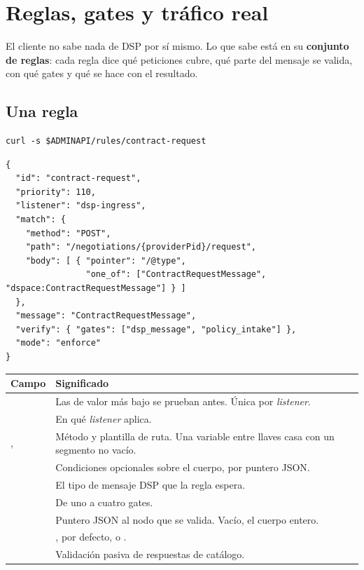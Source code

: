 \chapter{Reglas, gates y tráfico real}
\label{ch:reglas}

El cliente no sabe nada de DSP por sí mismo. Lo que sabe está en su \textbf{conjunto de reglas}: cada regla
dice qué peticiones cubre, qué parte del mensaje se valida, con qué gates y qué se hace con el resultado.

\section{Una regla}

\begin{lstlisting}[style=sh]
curl -s $ADMINAPI/rules/contract-request
\end{lstlisting}
\begin{lstlisting}[style=json]
{
  "id": "contract-request",
  "priority": 110,
  "listener": "dsp-ingress",
  "match": {
    "method": "POST",
    "path": "/negotiations/{providerPid}/request",
    "body": [ { "pointer": "/@type",
                "one_of": ["ContractRequestMessage", "dspace:ContractRequestMessage"] } ]
  },
  "message": "ContractRequestMessage",
  "verify": { "gates": ["dsp_message", "policy_intake"] },
  "mode": "enforce"
}
\end{lstlisting}

\noindent\begin{tabularx}{\linewidth}{@{}L{4cm}Y@{}}
\toprule
\textbf{Campo} & \textbf{Significado} \\
\midrule
{} & Las de valor más bajo se prueban antes. Única por \emph{listener}. \\
 & En qué \emph{listener} aplica. \\
,  & Método y plantilla de ruta. Una variable entre llaves casa con un segmento no vacío. \\
 & Condiciones opcionales sobre el cuerpo, por puntero JSON. \\
 & El tipo de mensaje DSP que la regla espera. \\
 & De uno a cuatro gates. \\
 & Puntero JSON al nodo que se valida. Vacío, el cuerpo entero. \\
 & , por defecto,  o . \\
 & Validación pasiva de respuestas de catálogo. \\
\bottomrule
\end{tabularx}

